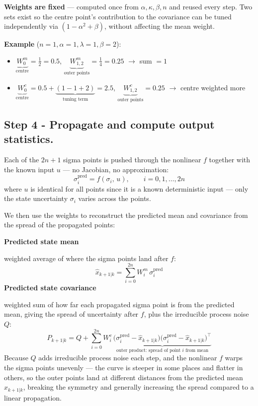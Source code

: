 \documentclass[12pt, a4paper]{article}
\begin{document}
\begin{notebox}
  \textbf{Weights are fixed} --- computed once from $\alpha, \kappa, \beta, n$ and
  reused every step. Two sets exist so the centre point's contribution to the
  covariance can be tuned independently via $(1-\alpha^2+\beta)$, without
  affecting the mean weight.

  \textbf{Example} ($n=1, \alpha=1, \lambda=1, \beta=2$):
  \begin{itemize}[leftmargin=1.4em, topsep=2pt]
    \item $\underbrace{W_0^m}_{\text{centre}} = \frac{1}{2} = 0.5$, \quad
          $\underbrace{W_{1,2}^m}_{\text{outer points}} = \frac{1}{4} = 0.25$ \quad
          $\rightarrow$ sum $= 1$ \checkmark
    \item $\underbrace{W_0^c}_{\text{centre}} = 0.5 + \underbrace{(1-1+2)}_{\text{tuning term}} = 2.5$, \quad
          $\underbrace{W_{1,2}^c}_{\text{outer points}} = 0.25$ \quad
          $\rightarrow$ centre weighted more 
  \end{itemize}
\end{notebox}
\vspace{-0.7cm}
\subsection*{Step 4 - Propagate and compute output statistics.}
Each of the $2n+1$ sigma points is pushed through the nonlinear $f$ together
with the known input $u$ --- no Jacobian, no approximation:
\[
  \sigma_i^{\text{pred}} = f(\sigma_i,\, u), \qquad i = 0, 1, \ldots, 2n
\]
where $u$ is identical for all points since it is a known deterministic input ---
only the state uncertainty $\sigma_i$ varies across the points.

We then use the weights to reconstruct the predicted mean and covariance
from the spread of the propagated points:

\textbf{Predicted state mean}

weighted average of where the sigma points land after $f$:
\[
  \hat{x}_{k+1|k} = \sum_{i=0}^{2n} W_i^m\, \sigma_i^{\text{pred}}
\]
\textbf{Predicted state covariance}

weighted sum of how far each propagated sigma point is from the predicted mean, giving the spread of uncertainty after $f$,
plus the irreducible process noise $Q$:
\[
  P_{k+1|k} = Q + \sum_{i=0}^{2n} W_i^c\,
    \underbrace{\bigl(\sigma_i^{\text{pred}} - \hat{x}_{k+1|k}\bigr)
    \bigl(\sigma_i^{\text{pred}} - \hat{x}_{k+1|k}\bigr)^\top}_{\text{outer product: spread of point } i \text{ from mean}}
\]
Because $Q$ adds irreducible process noise each step, and the nonlinear $f$
warps the sigma points unevenly --- the curve is steeper in some places and
flatter in others, so the outer points land at different distances from the
predicted mean $\hat{x}_{k+1|k}$, breaking the symmetry and generally
increasing the spread compared to a linear propagation.
\end{document}
